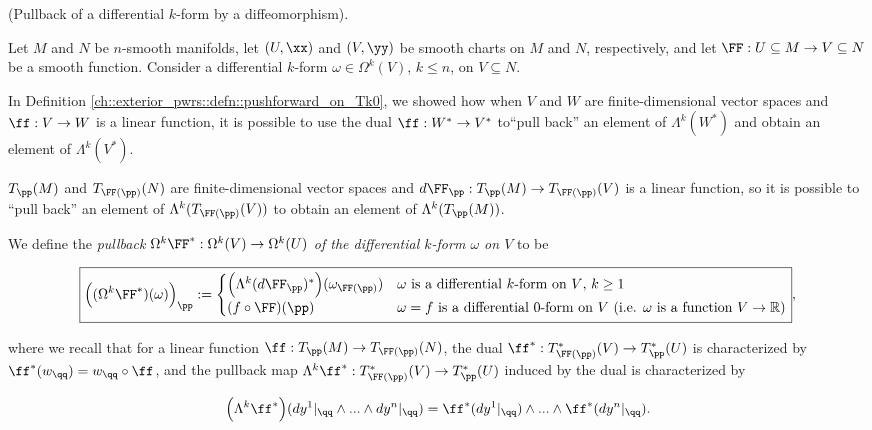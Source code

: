 \begin{defn}
\label{ch::diff_forms::defn::pullback_of_diff_form_by_diffeomorphism}
    (Pullback of a differential $k$-form by a diffeomorphism).
    
    Let $M$ and $N$ be $n$-smooth manifolds, let $(U, \xx)$ and $(V, \yy)$ be smooth charts on $M$ and $N$, respectively, and let $\FF:U \subseteq M \rightarrow V \subseteq N$ be a smooth function. Consider a differential $k$-form $\omega \in \Omega^k(V)$, $k \leq n$, on $V \subseteq N$.
    
    In Definition \ref{ch::exterior_pwrs::defn::pushforward_on_Tk0}, we showed how when $V$ and $W$ are finite-dimensional vector spaces and $\ff:V \rightarrow W$ is a linear function, it is possible to use the dual $\ff:W^* \rightarrow V^*$ to``pull back'' an element of $\Lambda^k(W^*)$ and obtain an element of $\Lambda^k(V^*)$. 
    
    $T_\pp(M)$ and $T_{\FF(\pp)}(N)$ are finite-dimensional vector spaces and ${d\FF_\pp:T_\pp(M) \rightarrow T_{\FF(\pp)}(V)}$ is a linear function, so it is possible to ``pull back'' an element of $\Lambda^k(T_{\FF(\pp)}(V))$ to obtain an element of $\Lambda^k(T_\pp(M))$.
    
    We define the \textit{pullback $\Omega^k \FF^*:\Omega^k(V) \rightarrow \Omega^k(U)$ of the differential $k$-form $\omega$ on $V$} to be
    
    \begin{align*}
        \boxed
        {
            \Big( (\Omega^k \FF^*)(\omega) \Big)_\pp :=
            \begin{cases}
                \Big( \Lambda^k (d\FF_\pp)^* \Big)(\omega_{\FF(\pp)}) & \text{$\omega$ is a differential $k$-form on $V$, $k \geq 1$} \\
                (f \circ \FF)(\pp) & \text{$\omega = f$ is a differential $0$-form on $V$ (i.e. $\omega$ is a function $V \rightarrow \R$)}
            \end{cases}
        },
    \end{align*}

    where we recall that for a linear function $\ff:T_\pp(M) \rightarrow T_{\FF(\pp)}(N)$, the dual $\ff^*:T_{\FF(\pp)}^*(V) \rightarrow T_\pp^*(U)$ is characterized by $\ff^*(w_\qq) = w_\qq \circ \ff$, and the pullback map $\Lambda^k \ff^*:T^*_{\FF(\pp)}(V) \rightarrow T^*_\pp(U)$ induced by the dual is characterized by

    \begin{align*}
        \Big(\Lambda^k \ff^* \Big)(dy^1|_\qq \wedge ... \wedge dy^n|_\qq) = \ff^*(dy^1|_\qq) \wedge ... \wedge \ff^*(dy^n|_\qq).
    \end{align*}
\end{defn}

